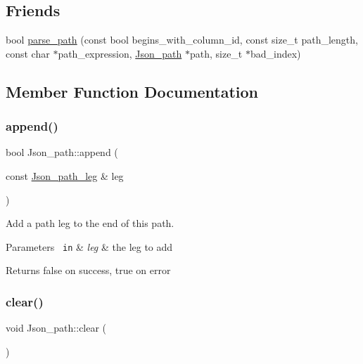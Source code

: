 \subsection*{Friends}
\begin{DoxyCompactItemize}
\item 
bool \mbox{\hyperlink{classJson__path_a6b1ee97299114765938fde20aaa41018}{parse\+\_\+path}} (const bool begins\+\_\+with\+\_\+column\+\_\+id, const size\+\_\+t path\+\_\+length, const char $\ast$path\+\_\+expression, \mbox{\hyperlink{classJson__path}{Json\+\_\+path}} $\ast$path, size\+\_\+t $\ast$bad\+\_\+index)
\end{DoxyCompactItemize}


\subsection{Member Function Documentation}
\mbox{\label{classJson__path_a72997695493718ef73ece75087713d64}} 
\subsubsection{\texorpdfstring{append()}{append()}}
{\footnotesize\ttfamily bool Json\+\_\+path\+::append (\begin{DoxyParamCaption}\item[{const \mbox{\hyperlink{classJson__path__leg}{Json\+\_\+path\+\_\+leg}} \&}]{leg }\end{DoxyParamCaption})}

Add a path leg to the end of this path. 
\begin{DoxyParams}[1]{Parameters}
\mbox{\texttt{ in}}  & {\em leg} & the leg to add \\
\hline
\end{DoxyParams}
\begin{DoxyReturn}{Returns}
false on success, true on error 
\end{DoxyReturn}
\mbox{\label{classJson__path_a7c9ebc624af2f9d494a7fbcdc3c92458}} 
\subsubsection{\texorpdfstring{clear()}{clear()}}
{\footnotesize\ttfamily void Json\+\_\+path\+::clear (\begin{DoxyParamCaption}{ }\end{DoxyParamCaption})}

